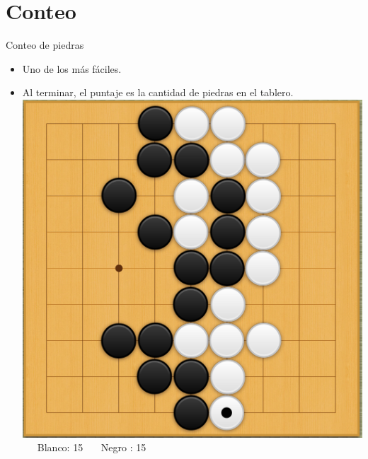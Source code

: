 \documentclass{beamer}
\begin{document}
%  
%    
%  

\section{Conteo}

\begin{frame}{Conteo de piedras}
  
  \begin{itemize}
    \item Uno de los más fáciles.
    \item Al terminar, el puntaje es la cantidad de piedras en el tablero. 
    \includegraphics[scale=0.17]{ejemplo-conteo.png} \ \ \ Blanco: 15 \ \ \ Negro : 15  
  \end{itemize}
  
\end{frame}
\end{document}

